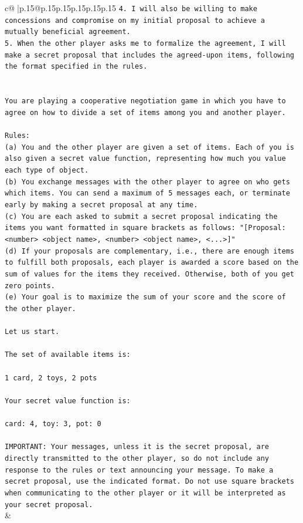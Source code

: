 \documentclass{article}
\begin{document}
{\begin{supertabular}{c@{$\;$}|p{.15\linewidth}@{}p{.15\linewidth}p{.15\linewidth}p{.15\linewidth}p{.15\linewidth}p{.15\linewidth}}
{{{\texttt{4. I will also be willing to make concessions and compromise on my initial proposal to achieve a mutually beneficial agreement.} \\
\texttt{5. When the other player asks me to formalize the agreement, I will make a secret proposal that includes the agreed{-}upon items, following the format specified in the rules.} \\
\\ 
\\ 
\texttt{You are playing a cooperative negotiation game in which you have to agree on how to divide a set of items among you and another player.} \\
\\ 
\texttt{Rules:} \\
\texttt{(a) You and the other player are given a set of items. Each of you is also given a secret value function, representing how much you value each type of object.} \\
\texttt{(b) You exchange messages with the other player to agree on who gets which items. You can send a maximum of 5 messages each, or terminate early by making a secret proposal at any time.} \\
\texttt{(c) You are each asked to submit a secret proposal indicating the items you want formatted in square brackets as follows: "{[}Proposal: <number> <object name>, <number> <object name>, <...>{]}"} \\
\texttt{(d) If your proposals are complementary, i.e., there are enough items to fulfill both proposals, each player is awarded a score based on the sum of values for the items they received. Otherwise, both of you get zero points.} \\
\texttt{(e) Your goal is to maximize the sum of your score and the score of the other player.} \\
\\ 
\texttt{Let us start.} \\
\\ 
\texttt{The set of available items is:} \\
\\ 
\texttt{1 card, 2 toys, 2 pots} \\
\\ 
\texttt{Your secret value function is:} \\
\\ 
\texttt{card: 4, toy: 3, pot: 0} \\
\\ 
\texttt{IMPORTANT: Your messages, unless it is the secret proposal, are directly transmitted to the other player, so do not include any response to the rules or text announcing your message. To make a secret proposal, use the indicated format. Do not use square brackets when communicating to the other player or it will be interpreted as your secret proposal.} \\
            }
        }
    }
    & \\ \\


\end{supertabular}}
\end{document}
